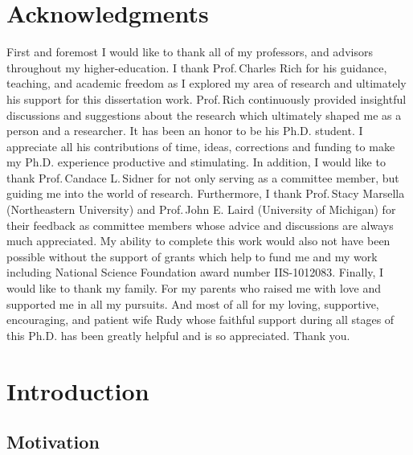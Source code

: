 \documentclass[12pt]{report}
\begin{document}
\chapter*{Acknowledgments}
First and foremost I would like to thank all of my professors, and advisors
throughout my higher-education. I thank Prof.\,Charles Rich for his guidance,
teaching, and academic freedom as I explored my area of research and ultimately
his support for this dissertation work. Prof.\,Rich continuously provided
insightful discussions and suggestions about the research which ultimately
shaped me as a person and a researcher. It has been an honor to be his Ph.D.
student. I appreciate all his contributions of time, ideas, corrections and
funding to make my Ph.D. experience productive and stimulating. In addition, I
would like to thank Prof.\,Candace L.\,Sidner for not only serving as a
committee member, but guiding me into the world of research. Furthermore, I
thank Prof.\,Stacy Marsella (Northeastern University) and Prof.\,John E. Laird
(University of Michigan) for their feedback as committee members whose advice
and discussions are always much appreciated. My ability to complete this work
would also not have been possible without the support of grants which help to
fund me and my work including National Science Foundation award number
IIS-1012083. Finally, I would like to thank my family. For my parents who raised
me with love and supported me in all my pursuits. And most of all for my loving,
supportive, encouraging, and patient wife Rudy whose faithful support during all
stages of this Ph.D. has been greatly helpful and is so appreciated. Thank you.

\pagebreak

\tableofcontents
\pagebreak

\listoffigures
\pagebreak

\listoftables
\pagebreak



\chapter{Introduction}
\label{ch:introduction}

\section{Motivation}
\end{document}
